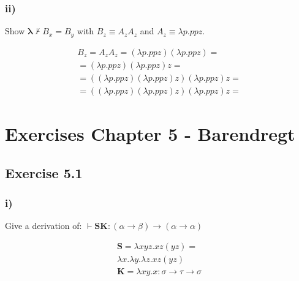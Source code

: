 \documentclass[11pt]{article}
\begin{document}
\subsubsection*{ii)}
Show $\mathbf{\lambda} \not \vdash B_x = B_y$ with $B_z \equiv A_z A_z$ and $A_z \equiv \lambda p.ppz$.

\begin{gather*}
B_z = A_z A_z = (\lambda p.ppz)(\lambda p.ppz) = \\
= (\lambda p.ppz)(\lambda p.ppz)z = \\
= ((\lambda p.ppz)(\lambda p.ppz)z)(\lambda p.ppz)z =  \\
= ((\lambda p.ppz)(\lambda p.ppz)z)(\lambda p.ppz)z =
\end{gather*}



\section*{Exercises Chapter 5 - Barendregt}
\subsection*{Exercise 5.1}
\subsubsection*{i)}

Give a derivation of: $\vdash \mathbf{SK} : (\alpha \rightarrow \beta) \rightarrow (\alpha \rightarrow \alpha)$

\begin{gather*}
\mathbf{S}= \lambda xyz. xz (yz) = \\
\lambda x. \lambda y. \lambda z. xz(yz)\\
\mathbf{K}= \lambda xy.x : \sigma \rightarrow \tau \rightarrow \sigma
\end{gather*}

\begin{center}




\DP
\end{center}
\end{document}
